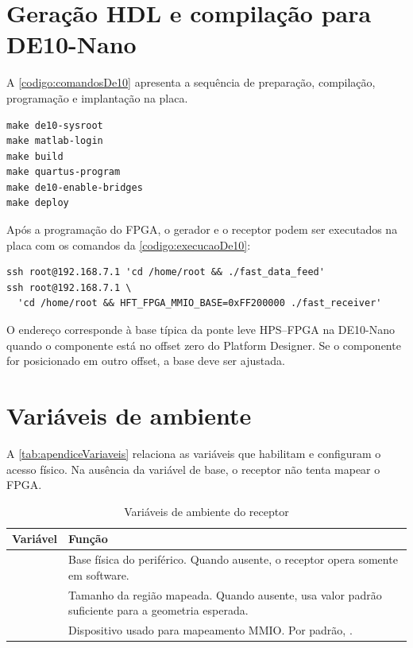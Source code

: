 \section{Geração HDL e compilação para DE10-Nano}\label{sec:apendiceDe10}

A \autoref{codigo:comandosDe10} apresenta a sequência de preparação, compilação, programação e implantação na placa.

\begin{sourcecode}[htb]
\caption{\label{codigo:comandosDe10}Fluxo previsto para DE10-Nano}
\begin{lstlisting}[frame=single]
make de10-sysroot
make matlab-login
make build
make quartus-program
make de10-enable-bridges
make deploy
\end{lstlisting}
\end{sourcecode}

Após a programação do FPGA, o gerador e o receptor podem ser executados na placa com os comandos da \autoref{codigo:execucaoDe10}:

\begin{sourcecode}[htb]
\caption{\label{codigo:execucaoDe10}Execução na placa}
\begin{lstlisting}[frame=single]
ssh root@192.168.7.1 'cd /home/root && ./fast_data_feed'
ssh root@192.168.7.1 \
  'cd /home/root && HFT_FPGA_MMIO_BASE=0xFF200000 ./fast_receiver'
\end{lstlisting}
\end{sourcecode}

O endereço  corresponde à base típica da ponte leve HPS--FPGA na DE10-Nano quando o componente está no offset zero do Platform Designer. Se o componente for posicionado em outro offset, a base deve ser ajustada.

\section{Variáveis de ambiente}\label{sec:apendiceVariaveis}

A \autoref{tab:apendiceVariaveis} relaciona as variáveis que habilitam e configuram o acesso físico. Na ausência da variável de base, o receptor não tenta mapear o FPGA.

\begin{table}[htb]
\caption{Variáveis de ambiente do receptor}
\label{tab:apendiceVariaveis}
\begin{tabularx}{\textwidth}{lX}
\toprule
\textbf{Variável} & \textbf{Função} \\ \midrule
\codigo{HFT_FPGA_MMIO_BASE} & Base física do periférico. Quando ausente, o receptor opera somente em software. \\
\codigo{HFT_FPGA_MMIO_SPAN} & Tamanho da região mapeada. Quando ausente, usa valor padrão suficiente para a geometria esperada. \\
\codigo{HFT_FPGA_MMIO_DEV} & Dispositivo usado para mapeamento MMIO. Por padrão, \codigo{/dev/mem}. \\ \bottomrule
\end{tabularx}
\end{table}

